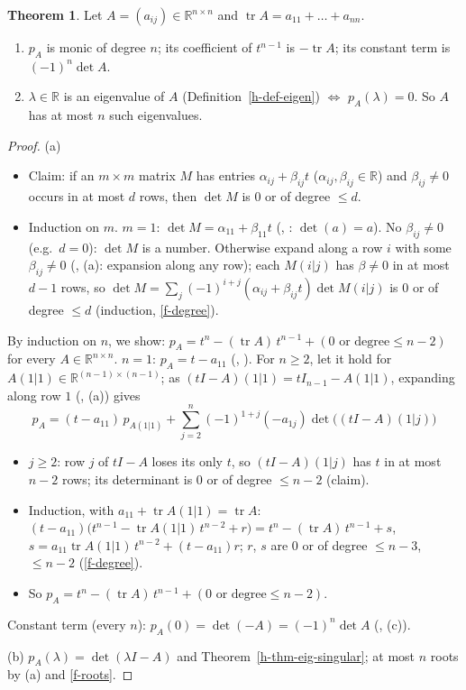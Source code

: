 \documentclass[12pt]{article}
\newcommand{\R}{\mathbb R}
\DeclareMathOperator{\tr}{tr}
\theoremstyle{definition}
\newtheorem{theorem}{Theorem}
\begin{document}
\begin{theorem}\label{h-thm-charpoly}
Let \(A=(a_{ij})\in\R^{n\times n}\) and \(\tr A=a_{11}+\dots+a_{nn}\).
\begin{enumerate}
\item \(p_A\) is monic of degree \(n\); its coefficient of \(t^{n-1}\) is \(-\tr A\); its constant term is
\((-1)^n\det A\).
\item \(\lambda\in\R\) is an eigenvalue of \(A\) (Definition~\ref{h-def-eigen}) \(\iff\) \(p_A(\lambda)=0\). So \(A\)
has at most \(n\) such eigenvalues.
\end{enumerate}
\end{theorem}
\begin{proof}
(a)
\begin{itemize}
\item Claim: if an \(m\times m\) matrix \(M\) has entries \(\alpha_{ij}+\beta_{ij}t\) (\(\alpha_{ij},\beta_{ij}\in\R\)) and
\(\beta_{ij}\ne0\) occurs in at most \(d\) rows, then \(\det M\) is \(0\) or of degree \(\leqslant d\).
\item Induction on \(m\). \(m=1\): \(\det M=\alpha_{11}+\beta_{11}t\) (, : \(\det(a)=a\)).
No \(\beta_{ij}\ne0\) (e.g.\ \(d=0\)): \(\det M\) is a number. Otherwise expand along a row \(i\) with some
\(\beta_{ij}\ne0\) (, (a): expansion along any row); each \(M(i|j)\) has \(\beta\ne0\) in at most \(d-1\) rows, so
\(\det M=\sum_j(-1)^{i+j}(\alpha_{ij}+\beta_{ij}t)\det M(i|j)\) is \(0\) or of degree \(\leqslant d\) (induction,
\ref{f-degree}).
\end{itemize}
By induction on \(n\), we show: \(p_A=t^n-(\tr A)\,t^{n-1}+(0\text{ or degree}\leqslant n-2)\) for every
\(A\in\R^{n\times n}\). \(n=1\): \(p_A=t-a_{11}\) (, ). For \(n\geqslant2\), let it hold for
\(A(1|1)\in\R^{(n-1)\times(n-1)}\); as
\((tI-A)(1|1)=tI_{n-1}-A(1|1)\), expanding along row \(1\) (, (a)) gives
\[
p_A=(t-a_{11})\,p_{A(1|1)}+\sum_{j=2}^n(-1)^{1+j}(-a_{1j})\det\bigl((tI-A)(1|j)\bigr)
\]
\begin{itemize}
\item \(j\geqslant2\): row \(j\) of \(tI-A\) loses its only \(t\), so \((tI-A)(1|j)\) has \(t\) in at most \(n-2\) rows;
its determinant is \(0\) or of degree \(\leqslant n-2\) (claim).
\item Induction, with \(a_{11}+\tr A(1|1)=\tr A\):
\((t-a_{11})\bigl(t^{n-1}-\tr A(1|1)\,t^{n-2}+r\bigr)=t^n-(\tr A)\,t^{n-1}+s\),
\(s=a_{11}\tr A(1|1)\,t^{n-2}+(t-a_{11})r\); \(r\), \(s\) are \(0\) or of degree \(\leqslant n-3\), \(\leqslant n-2\)
(\ref{f-degree}).
\item So \(p_A=t^n-(\tr A)\,t^{n-1}+(0\text{ or degree}\leqslant n-2)\).
\end{itemize}
Constant term (every \(n\)): \(p_A(0)=\det(-A)=(-1)^n\det A\) (, (c)).

(b) \(p_A(\lambda)=\det(\lambda I-A)\) and Theorem~\ref{h-thm-eig-singular}; at most \(n\) roots by (a) and
\ref{f-roots}.
\end{proof}
\end{document}
